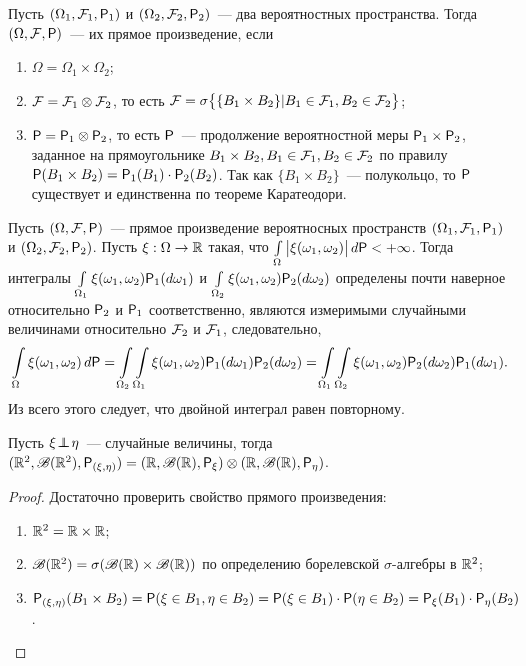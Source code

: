 \begin{definition}
	Пусть $(\Omega_1, \F_1, \P_1)$ и $(\Omega_2, \F_2, \P_2)$~--- два вероятностных пространства. Тогда $(\Omega, \F, \P)$~--- их прямое произведение, если 
	\begin{enumerate}
		\item $\Omega = \Omega_1 \times \Omega_2$;
		\item $\F = \F_1 \otimes \F_2$, то есть $\F = \sigma\big\{ \{ B_1 \times B_2 \} | B_1 \in \F_1, B_2 \in \F_2 \big\}$;
		\item $\P = \P_1 \otimes \P_2$, то есть  $\P$~--- продолжение вероятностной меры $\P_1 \times \P_2$, заданное на прямоугольнике $B_1 \times B_2, B_1 \in \F_1, B_2 \in \F_2$ по правилу $\P(B_1 \times B_2) = \P_1 (B_1) \cdot \P_2 (B_2)$. Так как $\{B_1 \times B_2 \}$~--- полукольцо, то $\P$ существует и единственна по теореме Каратеодори.
	\end{enumerate}
\end{definition}
\begin{theorem}[Фубини][б/д]
	Пусть $(\Omega, \F, \P)$~--- прямое произведение вероятносных пространств $(\Omega_1, \F_1, \P_1)$ и $(\Omega_2, \F_2, \P_2)$. Пусть $\xi : \Omega \rightarrow \R$ такая, что $\int\limits_\Omega \big| \xi (\omega_1, \omega_2) \big| \, d \P < + \infty$. Тогда интегралы $\int\limits_{\Omega_1} \xi (\omega_1, \omega_2) \P_1 (d \omega_1)$ и $\int\limits_{\Omega_2} \xi(\omega_1, \omega_2) \P_2 (d \omega_2)$ определены почти наверное относительно $\P_2$ и $\P_1$ соответственно, являются измеримыми случайными величинами относительно $\F_2$ и $\F_1$, следовательно, 
	$$\int\limits_\Omega \xi (\omega_1, \omega_2) \, d \P = \int\limits_{\Omega_2} \int\limits_{\Omega_1} \xi (\omega_1, \omega_2) \P_1 (d \omega_1) \P_2 (d \omega_2) = \int\limits_{\Omega_1} \int\limits_{\Omega_2} \xi(\omega_1, \omega_2) \P_2 (d \omega_2) \P_1 (d \omega_1).$$
	 Из всего этого следует, что двойной интеграл равен повторному.
\end{theorem}
\begin{statement}
 	Пусть $\xi \indep \eta$~--- случайные величины, тогда $(\R^2, \B(\R^2), \P_{(\xi, \eta)}) = (\R, \B(\R), \P_\xi) \otimes (\R, \B(\R), \P_\eta)$.
 	\begin{proof} Достаточно проверить свойство прямого произведения:
 		\begin{enumerate}
 			\item $\R^2 = \R \times \R$;
 			\item $\B(\R^2) = \sigma(\B(\R) \times \B(\R))$ по определению борелевской $\sigma$-алгебры в $\R^2$;
 			\item $\P_{(\xi, \eta)} (B_1 \times B_2) = \P(\xi \in B_1, \eta \in B_2) = \P(\xi \in B_1) \cdot \P(\eta \in B_2) = \P_\xi(B_1) \cdot \P_\eta (B_2)$. \qedhere
 		\end{enumerate}
 	\end{proof}
\end{statement}
